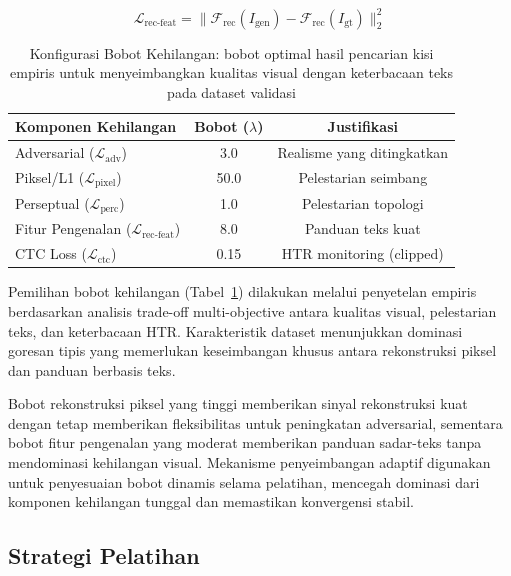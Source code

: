 \documentclass[journal]{IEEEtran}
\begin{document}
\begin{equation}
\mathcal{L}_{\text{rec-feat}} = \|\mathcal{F}_{\text{rec}}(I_{\text{gen}}) - \mathcal{F}_{\text{rec}}(I_{\text{gt}})\|_2^2
\end{equation}

\begin{table}[!t]
\renewcommand{\arraystretch}{1.3}
\caption{Konfigurasi Bobot Kehilangan: bobot optimal hasil pencarian kisi empiris untuk menyeimbangkan kualitas visual dengan keterbacaan teks pada dataset validasi}
\label{table_optimal_weights}
\centering
\begin{tabular}{|l|c|c|}
\hline
Komponen Kehilangan & Bobot ($\lambda$) & Justifikasi \\
\hline
Adversarial ($\mathcal{L}_{\text{adv}}$) & 3.0 & Realisme yang ditingkatkan \\
Piksel/L1 ($\mathcal{L}_{\text{pixel}}$) & 50.0 & Pelestarian seimbang \\
Perseptual ($\mathcal{L}_{\text{perc}}$) & 1.0 & Pelestarian topologi \\
Fitur Pengenalan ($\mathcal{L}_{\text{rec-feat}}$) & 8.0 & Panduan teks kuat \\
CTC Loss ($\mathcal{L}_{\text{ctc}}$) & 0.15 & HTR monitoring (clipped) \\
\hline
\end{tabular}
\end{table}

Pemilihan bobot kehilangan (Tabel~\ref{table_optimal_weights}) dilakukan melalui penyetelan empiris berdasarkan analisis trade-off multi-objective antara kualitas visual, pelestarian teks, dan keterbacaan HTR. Karakteristik dataset menunjukkan dominasi goresan tipis yang memerlukan keseimbangan khusus antara rekonstruksi piksel dan panduan berbasis teks.

Bobot rekonstruksi piksel yang tinggi memberikan sinyal rekonstruksi kuat dengan tetap memberikan fleksibilitas untuk peningkatan adversarial, sementara bobot fitur pengenalan yang moderat memberikan panduan sadar-teks tanpa mendominasi kehilangan visual. Mekanisme penyeimbangan adaptif digunakan untuk penyesuaian bobot dinamis selama pelatihan, mencegah dominasi dari komponen kehilangan tunggal dan memastikan konvergensi stabil.

\subsection{Strategi Pelatihan}
\end{document}
